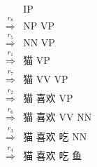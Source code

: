 

\begin{minipage}[t]{0.38\linewidth}
{\small
\begin{eqnarray}
& &\textrm{IP} \nonumber \\
& \overset{r_8}{\Rightarrow} & \textrm{NP VP} \nonumber \\
& \overset{r_5}{\Rightarrow} & \textrm{NN VP} \nonumber \\
& \overset{r_1}{\Rightarrow} & \textrm{猫 VP} \nonumber \\
& \overset{r_7}{\Rightarrow} & \textrm{猫 VV VP} \nonumber \\
& \overset{r_2}{\Rightarrow} & \textrm{猫 喜欢 VP} \nonumber \\
& \overset{r_6}{\Rightarrow} & \textrm{猫 喜欢 VV NN} \nonumber \\
& \overset{r_3}{\Rightarrow} & \textrm{猫 喜欢 吃 NN} \nonumber \\
& \overset{r_4}{\Rightarrow} & \textrm{猫 喜欢 吃 鱼} \nonumber
\end{eqnarray}
}
\end{minipage}
\hfill

